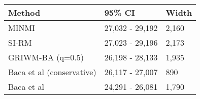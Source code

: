 
\begin{tabular}{lll}
\toprule
Method & 95\% CI & Width\\
\midrule
MINMI & 27,032 - 29,192 & 2,160\\
SI-RM & 27,023 - 29,196 & 2,173\\
GRIWM-BA (q=0.5) & 26,198 - 28,133 & 1,935\\
Baca et al (conservative) & 26,117 - 27,007 & 890\\
Baca et al & 24,291 - 26,081 & 1,790\\
\bottomrule
\end{tabular}
